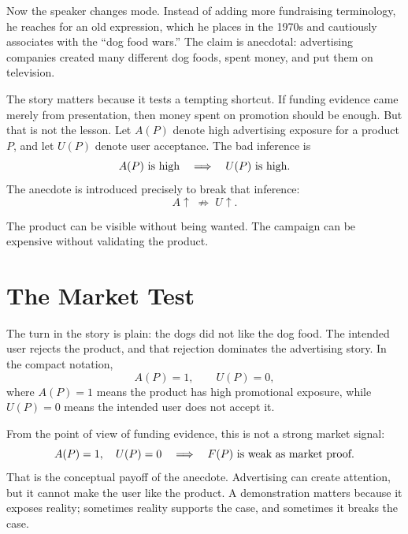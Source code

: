 Now the speaker changes mode. Instead of adding more fundraising terminology, he reaches for an old expression, which he places in the 1970s and cautiously associates with the ``dog food wars.'' The claim is anecdotal: advertising companies created many different dog foods, spent money, and put them on television.

The story matters because it tests a tempting shortcut. If funding evidence came merely from presentation, then money spent on promotion should be enough. But that is not the lesson. Let \(A(P)\) denote high advertising exposure for a product \(P\), and let \(U(P)\) denote user acceptance. The bad inference is
\begin{equation}
A(P)\ \hbox{is high}
\quad\Longrightarrow\quad
U(P)\ \hbox{is high}.
\end{equation}
The anecdote is introduced precisely to break that inference:
\begin{equation}
A \uparrow \;\not\Rightarrow\; U \uparrow .
\end{equation}

The product can be visible without being wanted. The campaign can be expensive without validating the product.

\section{The Market Test}

The turn in the story is plain: the dogs did not like the dog food. The intended user rejects the product, and that rejection dominates the advertising story. In the compact notation,
\begin{equation}
A(P)=1,
\qquad
U(P)=0,
\end{equation}
where \(A(P)=1\) means the product has high promotional exposure, while \(U(P)=0\) means the intended user does not accept it.

From the point of view of funding evidence, this is not a strong market signal:
\begin{equation}
A(P)=1,\quad U(P)=0
\quad\Longrightarrow\quad
F(P)\ \hbox{is weak as market proof}.
\end{equation}
That is the conceptual payoff of the anecdote. Advertising can create attention, but it cannot make the user like the product. A demonstration matters because it exposes reality; sometimes reality supports the case, and sometimes it breaks the case.

